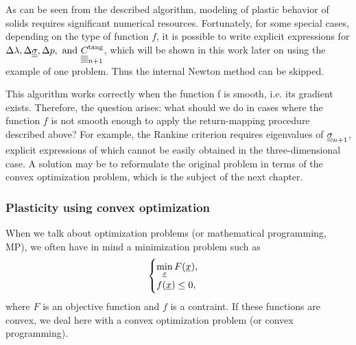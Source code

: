 \documentclass[12pt]{article}
\begin{document}
As can be seen from the described algorithm, modeling of plastic behavior of solids requires significant numerical resources. Fortunately, for some special cases, depending on the type of function $f$, it is possible to write explicit expressions for $\Delta\lambda, \Delta\underline{\underline{\sigma}}, \Delta p,  \text{ and } \underline{\underline{\underline{\underline{C_{}}}}}_{n+1}^\text{tang}$, which will be shown in this work later on using the example of one problem. Thus the internal Newton method can be skipped.



This algorithm works correctly when the function f is smooth, i.e. its gradient exists. Therefore, the question arises: what should we do in cases where the function $f$ is not smooth enough to apply the return-mapping procedure described above? For example, the Rankine criterion requires eigenvalues of $\underline{\underline{\sigma}}_{n+1}$, explicit expressions of which cannot be easily obtained in the three-dimensional case. A solution may be to reformulate the original problem in terms of the convex optimization problem, which is the subject of the next chapter.


\subsubsection{Plasticity using convex optimization}

When we talk about optimization problems (or mathematical programming, MP), we often have in mind a minimization problem such as
\begin{equation}
    \begin{cases}
        \min\limits_{\underline{x}} F(\underline{x}),\\
        f(\underline{x}) \leq 0,
    \end{cases}
\end{equation}
where $F$ is an objective function and $f$ is a contraint. If these functions are convex, we deal here with a convex optimization problem (or convex programming). 
\end{document}

